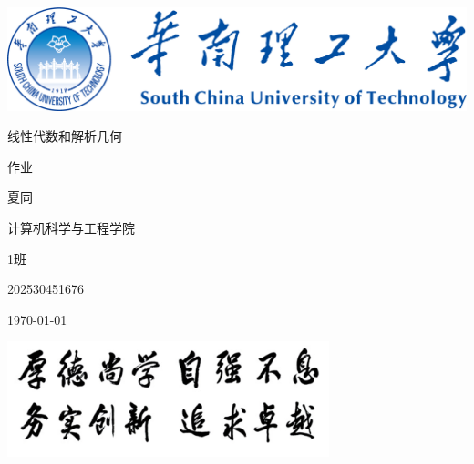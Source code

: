\begin{titlepage}
    \centering
    \vspace*{0.5cm}
        \includegraphics[width=\textwidth]{flg/mylogo.png} %
    \par\vspace{1cm}
    {\fontsize{55}{55}\selectfont\songti 线性代数和解析几何 \par}
    \vspace{0.1cm} %
    {\fontsize{65}{65}\selectfont\songti 作业 \par}
    \vspace{1cm} %
    {\Large {} 夏同 \par}
    \vspace{0.1cm}
    {\Large {} 计算机科学与工程学院 \par}
    \vspace{0.1cm}
    {\Large {} 1班 \par}
    \vspace{0.1cm}
    {\Large {} 202530451676 \par}
    \vspace{0.1cm}
    {\Large {} \today \par}
    \vspace{0.5cm}
        \includegraphics[width=0.7\textwidth]{flg/saying.png} %
    \par\vspace{1cm}
\end{titlepage}